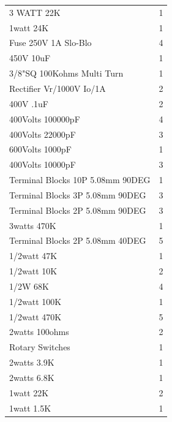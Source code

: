 \documentclass[journal]{IEEEtran}
\begin{document}
\begin{table}[]
\begin{tabular}{l|l}
			3 WATT 22K                            & 1          \\
			1watt 24K                             & 1          \\
			Fuse 250V 1A Slo-Blo                  & 4          \\
			450V 10uF                             & 1          \\
			3/8"SQ 100Kohms Multi Turn            & 1          \\
			Rectifier Vr/1000V Io/1A              & 2          \\
			400V .1uF                             & 2          \\
			400Volts 100000pF                     & 4          \\
			400Volts 22000pF                      & 3          \\
			600Volts 1000pF                       & 1          \\
			400Volts 10000pF                      & 3          \\
			Terminal Blocks 10P 5.08mm 90DEG      & 1          \\
			Terminal Blocks 3P 5.08mm 90DEG       & 3          \\
			Terminal Blocks 2P 5.08mm 90DEG       & 3          \\
			3watts 470K                           & 1          \\
			Terminal Blocks 2P 5.08mm 40DEG       & 5          \\
			1/2watt 47K                           & 1          \\
			1/2watt 10K                           & 2          \\
			1/2W 68K                              & 4          \\
			1/2watt 100K                          & 1          \\
			1/2watt 470K                          & 5          \\
			2watts 100ohms                        & 2          \\
			Rotary Switches                       & 1          \\
			2watts 3.9K                           & 1          \\
			2watts 6.8K                           & 1          \\
			1watt 22K                             & 2          \\
			1watt 1.5K                            & 1          \\

\end{tabular}
\end{table}
\end{document}

